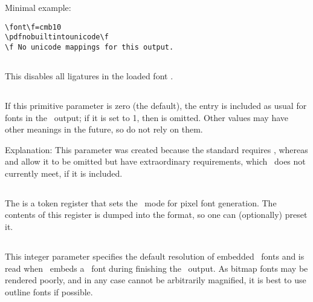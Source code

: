 \documentclass{pdftexmanual}
\begin{document}
Minimal example: 
\begin{verbatim}
\font\f=cmb10
\pdfnobuiltintounicode\f
\f No unicode mappings for this output.
\end{verbatim}

\subsection{}

This disables all ligatures in the loaded font .

\subsection{}

If this primitive parameter is zero (the default), the 
entry is included as usual for fonts in the \PDF\ output; if it is set
to 1, then  is omitted. Other values may have other
meanings in the future, so do not rely on them.

Explanation: This parameter was created because the  standard
requires , whereas  and  allow it to be
omitted but have extraordinary requirements, which \PDFTEX\ does not
currently meet, if it is included.

\subsection{}

The  is a token register that sets the \METAFONT\ mode for
pixel font generation. The contents of this register is dumped into the
format, so one can (optionally) preset it. 

\subsection{}

This integer parameter specifies the default resolution of embedded \PK\
fonts and is read when \PDFTEX\ embeds a \PK\ font during finishing the
\PDF\ output. As bitmap fonts may be rendered poorly, and in any case
cannot be arbitrarily magnified, it is best to use outline fonts if
possible.
\end{document}
